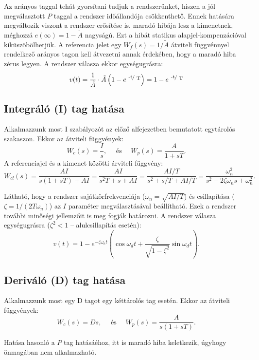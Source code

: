 Az arányos taggal tehát gyorsítani tudjuk a rendszerünket, hiszen a jól
megválasztott $P$ taggal a rendszer időállandója csökkenthető. Ennek hatására
megváltozik viszont a rendszer erősítése is, maradó hibája lesz a kimenetnek,
méghozzá $e(\infty) = 1 - \tilde A$ nagyságú. Ezt a hibát statikus
alapjel-kompenzációval kiküszöbölhetjük. A referencia jelet egy $W_f(s) = 1 /
  \tilde A$ átviteli függvénnyel rendelkező arányos tagon kell átvezetni annak
érdekében, hogy a maradó hiba zérus legyen. A rendszer válasza ekkor
egységugrásra:
\begin{equation}
  v(t)
  = \frac{1}{\tilde A} \cdot \tilde A \left( 1 - e^{\slashfrac{-t}{T}} \right)
  = 1 - e^{\slashfrac{-t}{T}}
  \label{eq:P-use-step}
\end{equation}

\subsection{Integráló (I) tag hatása}

Alkalmazzunk most I szabályozót az előző alfejezetben bemutatott egytárolós
szakaszon. Ekkor az átviteli függvények:
\begin{equation}
  W_c(s) = \frac{I}{s},
  \quad \text{ és } \quad
  W_p(s) = \frac{A}{1 + sT}
  .
  \label{eq:I-use-CP}
\end{equation}
A referenciajel és a kimenet közötti árviteli függvény:
\begin{equation}
  W_{cl}(s)
  = \frac{AI}{s(1 + sT) + AI}
  = \frac{AI}{s^2 T + s + AI}
  = \frac{AI / T}{s ^ 2 + s / T + AI / T}
  = \frac{\omega_n^2}{s^2 + 2 \zeta \omega_n s + \omega_n^2}
  .
  \label{eq:I-use-cl}
\end{equation}

Látható, hogy a rendszer sajátkörfrekvenciája ($\omega_n = \sqrt{AI / T}$) és
csillapítása ($\zeta = 1 / (2 T \omega_n)$) az $I$ paraméter
megválasztásával beállítható. Ezek a rendszer további minőségi jellemzőit
is meg fogják határozni. A rendszer válasza egységugrásra ($\zeta^2 < 1$ --
alulcsillapítás esetén):
\begin{equation}
  v(t)
  = 1 - e^{-\zeta \omega_n t} \left(
  \cos \omega_d t + \frac{\zeta}{\sqrt{1 - \zeta^2}}  \sin \omega_d t
  \right)
  .
  \label{eq:I-use-step}
\end{equation}

\subsection{Deriváló (D) tag hatása}

Alkalmazzunk most egy D tagot egy kéttárolós tag esetén. Ekkor az átviteli
függvények:
\begin{equation}
  W_c(s) = Ds,
  \quad \text{ és } \quad
  W_p(s) = \frac{A}{s (1 + sT)}
  .
  \label{eq:D-use-CP}
\end{equation}

Hatása hasonló a $P$ tag hatásáéhoz, itt is maradó hiba keletkezik, úgyhogy
önmagában nem alkalmazható.
